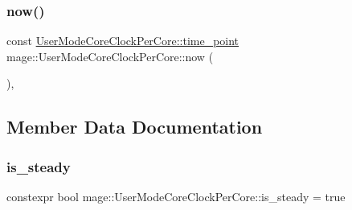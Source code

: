 \subsubsection{\texorpdfstring{now()}{now()}}
{\footnotesize\ttfamily const \mbox{\hyperlink{structmage_1_1_user_mode_core_clock_per_core_a52312b09168e0f4a8cace07d94be5427}{User\+Mode\+Core\+Clock\+Per\+Core\+::time\+\_\+point}} mage\+::\+User\+Mode\+Core\+Clock\+Per\+Core\+::now (\begin{DoxyParamCaption}{ }\end{DoxyParamCaption})\hspace{0.3cm}{\ttfamily [static]}, {\ttfamily [noexcept]}}



\subsection{Member Data Documentation}
\mbox{\label{structmage_1_1_user_mode_core_clock_per_core_ae41f27cabafd1e7d5b703d3ebf32a97d}} 
\subsubsection{\texorpdfstring{is\+\_\+steady}{is\_steady}}
{\footnotesize\ttfamily constexpr bool mage\+::\+User\+Mode\+Core\+Clock\+Per\+Core\+::is\+\_\+steady = true\hspace{0.3cm}{\ttfamily [static]}}

